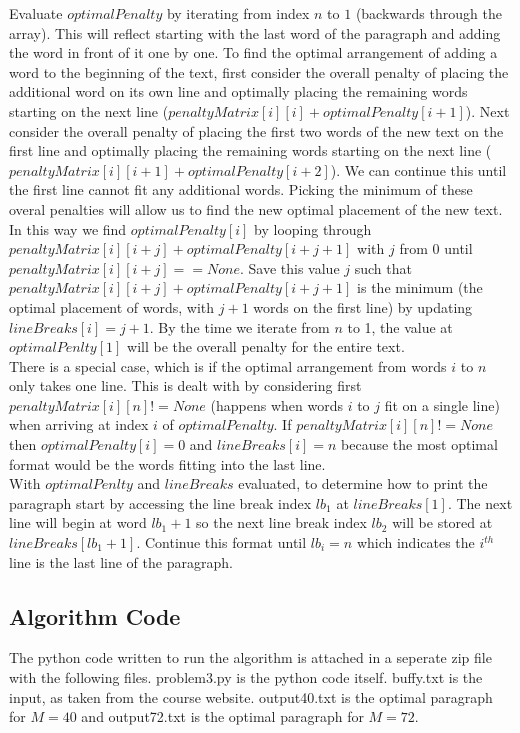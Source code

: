 \documentclass[11pt]{article}
\begin{document}
Evaluate $optimalPenalty$ by iterating from index $n$ to $1$ (backwards through the array). This will reflect starting with the last word of the paragraph and adding the word in front of it one by one. To find the optimal arrangement of adding a word to the beginning of the text, first consider the overall penalty of placing the additional word on its own line and optimally placing the remaining words starting on the next line ($penaltyMatrix[i][i] + optimalPenalty[i+1]$). Next consider the overall penalty of placing the first two words of the new text on the first line and optimally placing the remaining words starting on the next line ($penaltyMatrix[i][i+1] + optimalPenalty[i+2]$). We can continue this until the first line cannot fit any additional words. Picking the minimum of these overal penalties will allow us to find the new optimal placement of the new text. In this way we find $optimalPenalty[i]$ by looping through $penaltyMatrix[i][i+j] + optimalPenalty[i+j+1]$ with $j$ from 0 until $penaltyMatrix[i][i+j] == None$. Save this value $j$ such that $penaltyMatrix[i][i+j] + optimalPenalty[i+j+1]$ is the minimum (the optimal placement of words, with $j+1$ words on the first line) by updating $lineBreaks[i]=j+1$. By the time we iterate from $n$ to 1, the value at $optimalPenlty[1]$ will be the overall penalty for the entire text. \\

There is a special case, which is if the optimal arrangement from words $i$ to $n$ only takes one line. This is dealt with by considering first $penaltyMatrix[i][n] != None$ (happens when words $i$ to $j$ fit on a single line) when arriving at index $i$ of $optimalPenalty$. If $penaltyMatrix[i][n] != None$  then $optimalPenalty[i]=0$ and $lineBreaks[i]=n$ because the most optimal format would be the words fitting into the last line.\\

With $optimalPenlty$ and $lineBreaks$ evaluated, to determine how to print the paragraph start by accessing the line break index $lb_1$ at $lineBreaks[1]$. The next line will begin at word $lb_1 + 1$ so the next line break index $lb_2$ will be stored at $lineBreaks[lb_1 +1]$. Continue this format until $lb_i = n$ which indicates the $i^{th}$ line is the last line of the paragraph.

\subsection*{Algorithm Code}
The python code written to run the algorithm is attached in a seperate zip file with the following files. problem3.py is the python code itself. buffy.txt is the input, as taken from the course website. output40.txt is the optimal paragraph for $M=40$ and output72.txt is the optimal paragraph for $M=72$.
\end{document}
